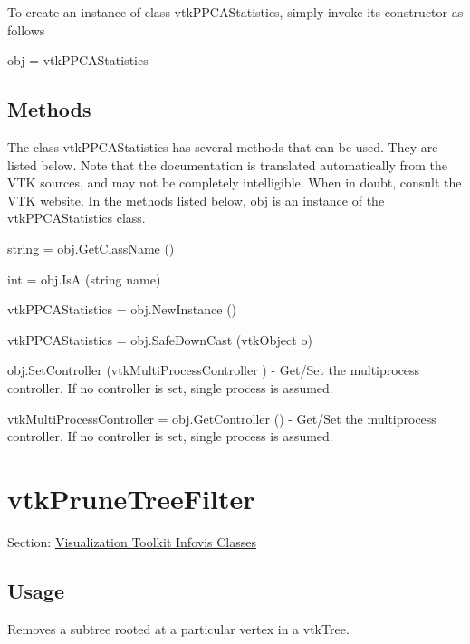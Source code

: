 To create an instance of class vtk\-P\-P\-C\-A\-Statistics, simply invoke its constructor as follows \begin{DoxyVerb}  obj = vtkPPCAStatistics
\end{DoxyVerb}
 \hypertarget{vtkwidgets_vtkxyplotwidget_Methods}{}\subsection{Methods}\label{vtkwidgets_vtkxyplotwidget_Methods}
The class vtk\-P\-P\-C\-A\-Statistics has several methods that can be used. They are listed below. Note that the documentation is translated automatically from the V\-T\-K sources, and may not be completely intelligible. When in doubt, consult the V\-T\-K website. In the methods listed below, {\ttfamily obj} is an instance of the vtk\-P\-P\-C\-A\-Statistics class. 
\begin{DoxyItemize}
\item {\ttfamily string = obj.\-Get\-Class\-Name ()}  
\item {\ttfamily int = obj.\-Is\-A (string name)}  
\item {\ttfamily vtk\-P\-P\-C\-A\-Statistics = obj.\-New\-Instance ()}  
\item {\ttfamily vtk\-P\-P\-C\-A\-Statistics = obj.\-Safe\-Down\-Cast (vtk\-Object o)}  
\item {\ttfamily obj.\-Set\-Controller (vtk\-Multi\-Process\-Controller )} -\/ Get/\-Set the multiprocess controller. If no controller is set, single process is assumed.  
\item {\ttfamily vtk\-Multi\-Process\-Controller = obj.\-Get\-Controller ()} -\/ Get/\-Set the multiprocess controller. If no controller is set, single process is assumed.  
\end{DoxyItemize}\hypertarget{vtkinfovis_vtkprunetreefilter}{}\section{vtk\-Prune\-Tree\-Filter}\label{vtkinfovis_vtkprunetreefilter}
Section\-: \hyperlink{sec_vtkinfovis}{Visualization Toolkit Infovis Classes} \hypertarget{vtkwidgets_vtkxyplotwidget_Usage}{}\subsection{Usage}\label{vtkwidgets_vtkxyplotwidget_Usage}
Removes a subtree rooted at a particular vertex in a vtk\-Tree.


